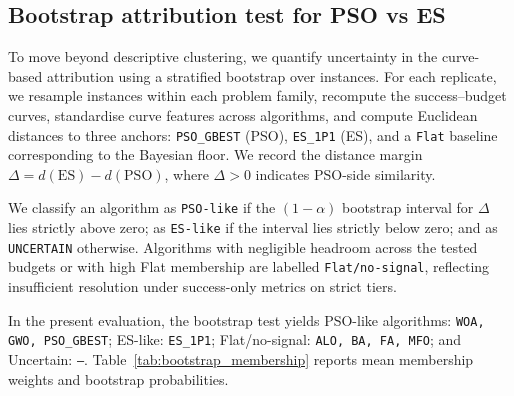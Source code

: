 \subsection{Bootstrap attribution test for PSO vs ES}
\label{subsec:bootstrap_attribution}

To move beyond descriptive clustering, we quantify uncertainty in the curve-based attribution using a stratified bootstrap over instances. For each replicate, we resample instances within each problem family, recompute the success--budget curves, standardise curve features across algorithms, and compute Euclidean distances to three anchors: \texttt{PSO_GBEST} (PSO), \texttt{ES_1P1} (ES), and a \texttt{Flat} baseline corresponding to the Bayesian floor. We record the distance margin $\Delta = d(\mathrm{ES}) - d(\mathrm{PSO})$, where $\Delta>0$ indicates PSO-side similarity.

We classify an algorithm as \texttt{PSO-like} if the $(1-\alpha)$ bootstrap interval for $\Delta$ lies strictly above zero; as \texttt{ES-like} if the interval lies strictly below zero; and as \texttt{UNCERTAIN} otherwise. Algorithms with negligible headroom across the tested budgets or with high Flat membership are labelled \texttt{Flat/no-signal}, reflecting insufficient resolution under success-only metrics on strict tiers.

In the present evaluation, the bootstrap test yields PSO-like algorithms: \texttt{WOA, GWO, PSO_GBEST}; ES-like: \texttt{ES_1P1}; Flat/no-signal: \texttt{ALO, BA, FA, MFO}; and Uncertain: \texttt{---}. Table~\ref{tab:bootstrap_membership} reports mean membership weights and bootstrap probabilities.
